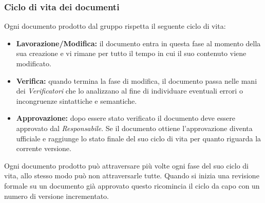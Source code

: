 \documentclass[a4paper]{article}
\begin{document}
		\subsubsection{Ciclo di vita dei documenti}
		Ogni documento prodotto dal gruppo rispetta il seguente ciclo di vita:
		\begin{itemize}
			\item \textbf{Lavorazione/Modifica:} il documento entra in questa fase al momento della sua creazione e vi
			rimane per tutto il tempo in cui il suo contenuto viene modificato.
			\item \textbf{Verifica:} quando termina la fase di modifica, il documento passa nelle mani dei
			\emph{Verificatori}	che lo analizzano al fine di individuare eventuali errori o incongruenze sintattiche e semantiche.
			\item \textbf{Approvazione:} dopo essere stato verificato il documento deve essere approvato dal
			\emph{Responsabile}. Se il documento ottiene l'approvazione diventa ufficiale e raggiunge lo stato finale del
			suo ciclo di vita per quanto riguarda la corrente versione.
		\end{itemize}
		Ogni documento prodotto può attraversare più volte ogni fase del suo ciclo di vita, allo stesso modo può non
		attraversarle tutte. Quando si inizia una revisione formale su un documento già approvato questo ricomincia il
		ciclo da capo con un numero di versione incrementato.

	\newpage
\end{document}
